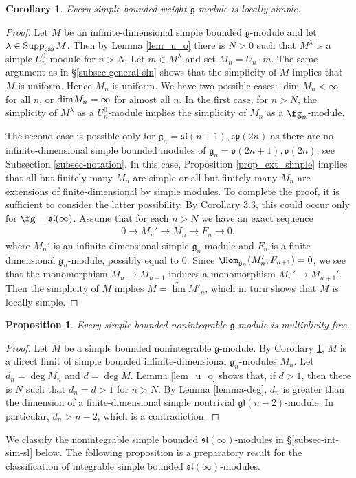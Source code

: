 \documentclass[12pt]{amsart}
\def\gg{\mathfrak{g}}
\newtheorem{prop}[thm]{Proposition}
\newtheorem{cor}[thm]{Corollary}
\begin{document}
\begin{cor} \label{cor-loc-simple}
Every simple bounded weight $\gg$-module is locally simple.
\end{cor}
\begin{proof}
Let $M$ be an  infinite-dimensional simple bounded $\gg$-module and let $\lambda \in {\rm Supp}_{\rm ess}\, M$. Then by Lemma \ref{lem_u_o}  there is $N>0$ such that $M^{\lambda}$ is a simple $U^0_n$-module for $n>N$. Let $m \in M^{\lambda}$ and set $M_n = U_n \cdot m$.  The same argument as in \S\ref{subsec-general-sln} shows that the simplicity of $M$ implies that $M$ is uniform. Hence $M_n$ is uniform. We have two possible cases: $\dim M_n<\infty$ for all $n$, or $\textup{dim}M_n=\infty$ for almost all $n$. In the first case, for $n>N$, the simplicity of $M^\lambda$ as a $U^0_n$-module implies the simplicity of $M_n$ as a $\fg_n$-module. 

The second case is possible only for $\gg_n = \mathfrak{sl}(n+1), \mathfrak{sp}(2n)$ as there are no infinite-dimensional simple bounded modules of $\gg_n = \mathfrak{o}(2n+1),  \mathfrak{o}(2n)$, see Subsection \ref{subsec-notation}. In this case, Proposition \ref{prop_ext_simple} implies that all but finitely many $M_n$ are simple or all but finitely many $M_n$  are extensions of finite-dimensional by simple modules. To complete the proof, it is sufficient to consider the latter possibility. By Corollary 3.3, this could occur only for $\fg=\mathfrak{sl}(\infty)$. Assume that for each $n>N$ we have an exact sequence
\begin{eqnarray*}
0 \to M_n' \to M_n \to F_n \to 0,
\end{eqnarray*}
where $M_n'$ is an infinite-dimensional simple $\gg_n$-module and $F_n$ is a finite-dimensional $\gg_n$-module, possibly equal to $0$. Since $\Hom_{\gg_n} (M_n', F_{n+1})= 0$, we see that the monomorphism $M_n \to M_{n+1}$ induces a monomorphism  $M_n' \to M_{n+1}'$. Then the simplicity of $M$  implies  $M=\underrightarrow\lim M'_n$, which in turn shows that $M$ is locally simple.\end{proof}



\begin{prop} \label{prop-mult-free}
Every simple bounded nonintegrable $\gg$-module is multiplicity free.
\end{prop}
\begin{proof}
Let $M$ be a simple bounded nonintegrable $\gg$-module. By Corollary \ref{cor-loc-simple}, $M$ is a direct limit of simple bounded infinite-dimensional $\gg_n$-modules $M_n$. Let $d_n = \deg M_n$ and $d = \deg M$. Lemma \ref{lem_u_o} shows that, if $d>1$, then there is $N$ such that $d_n = d>1$ for $n>N$. By Lemma \ref{lemma-deg}, $d_n$ is greater than the dimension of a finite-dimensional simple nontrivial $\mathfrak{gl}({n-2})$-module. In particular, $d_n>n-2$, which is a contradiction.\end{proof}
We classify the nonintegrable simple bounded $\mathfrak{sl}(\infty)$-modules in \S \ref{subsec-int-sim-sl} below.
The following proposition is a preparatory result for the classification of integrable simple bounded $\mathfrak{sl}(\infty)$-modules. 
\end{document}
